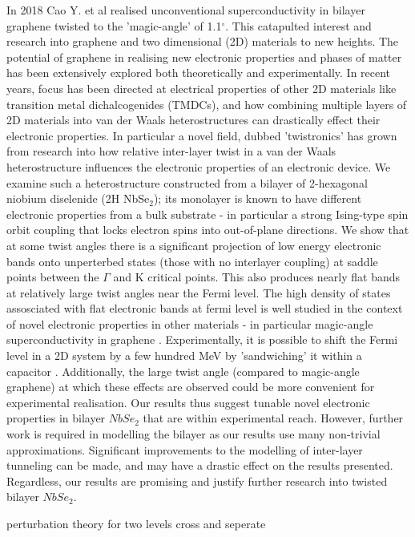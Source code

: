 \documentclass[12pt]{report} %
\begin{document}
  In 2018 Cao Y. et al\cite{Cao2018} realised unconventional superconductivity in bilayer graphene twisted to the 'magic-angle' of 1.1$^\circ$. This catapulted interest and research into graphene and two dimensional (2D) materials to new heights. The potential of graphene in realising new electronic properties and phases of matter has been extensively explored both theoretically and experimentally. In recent years, focus has been directed at electrical properties of other 2D materials like transition metal dichalcogenides (TMDCs), and how combining multiple layers  of 2D materials into van der Waals heterostructures can drastically effect their electronic properties. In particular a novel field, dubbed 'twistronics' has grown from research into how relative inter-layer twist in a van der Waals heterostructure influences the electronic properties of an electronic device. We examine such a heterostructure constructed from a bilayer of 2-hexagonal niobium diselenide (2H NbSe$_2$); its monolayer is known to have different electronic properties from a bulk substrate - in particular a strong Ising-type spin orbit coupling that locks electron spins into out-of-plane directions. We show that at some twist angles there is a significant projection of low energy electronic bands onto unperterbed states (those with no interlayer coupling) at saddle points between the $\Gamma$ and K critical points. This also produces nearly flat bands at relatively large twist angles near the Fermi level. The high density of states assosciated with flat electronic bands at fermi level is well studied in the context of novel electronic properties in other materials \cite{} - in particular magic-angle superconductivity in graphene \cite{}. Experimentally, it is possible to shift the Fermi level in a 2D system by a few hundred MeV by 'sandwiching' it within a capacitor \cite{}. Additionally, the large twist angle (compared to magic-angle graphene) at which these effects are observed could be more convenient for experimental realisation. Our results thus suggest tunable novel electronic properties in bilayer $NbSe_2$ that are within experimental reach. However, further work is required in modelling the bilayer as our results use many non-trivial approximations. Significant improvements to the modelling of inter-layer tunneling can be made, and may have a drastic effect on the results presented. Regardless, our results are promising and justify further research into twisted bilayer $NbSe_2$.

  perturbation theory for two levels cross and seperate
\end{document}
